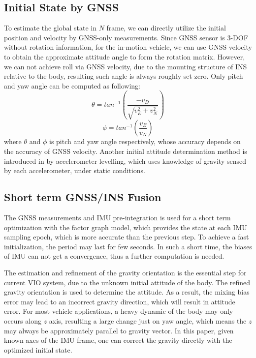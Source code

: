 \documentclass[journal,article,submit,moreauthors,pdftex]{Definitions/mdpi}
\begin{document}
\subsection{Initial State by GNSS}
To estimate the global state in $N$ frame, we can directly utilize the initial position and velocity  by GNSS-only measurements. Since GNSS sensor is 3-DOF without rotation information, for the in-motion vehicle, we can use GNSS velocity to obtain the approximate attitude angle to form the rotation matrix. However, we can not achieve roll via GNSS velocity, due to the mounting structure of INS relative to the body, resulting such angle is always roughly set zero. Only pitch and yaw angle can be computed as following:
\begin{equation}
	\theta = tan^{-1} \left( \frac{-v_D}{\sqrt{v_E^2+v_N^2}} \right)
\end{equation}
\begin{equation}
	\phi = tan^{-1} \left( \frac{v_E}{v_N} \right)
\end{equation}
where $\theta$ and $\phi$ is pitch and yaw angle respectively, whose accuracy depends on the accuracy of GNSS velocity. Another initial attitude determination method is introduced in \cite{Godha2006PerformanceEO} by accelerometer levelling, which uses knowledge of gravity sensed by each accelerometer, under static conditions. 

\subsection{Short term GNSS/INS Fusion}
The GNSS measurements and IMU pre-integration is used for a short term optimization with the factor graph model, which provides the state at each IMU sampling epoch, which is more accurate than the previous step. To achieve a fast initialization, the period may last for few seconds. In such a short time, the biases of IMU can not get a convergence, thus a further computation is needed. 

The estimation and refinement of the gravity orientation is the essential step for current VIO system, due to the unknown initial attitude of the body. The refined gravity orientation is used to determine the attitude\cite{qinRobustInitializationMonocular2017}. As a result, the mixing bias error may lead to an incorrect gravity direction, which will result in attitude error. For most vehicle applications, a heavy dynamic of the body may only occurs along $z$ axis, resulting a large change just on yaw angle, which means the $z$ may always be approximately parallel to gravity vector. In this paper, given known axes of the IMU frame, one can correct the gravity directly with the optimized initial state. 
\end{document}
